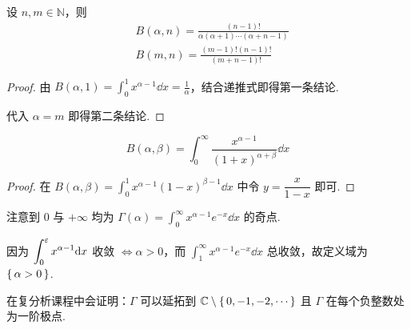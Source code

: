 \begin{inference}
    设 $n,m\in\mathbb{N}$，则
$$
\begin{aligned}
    &B(\alpha,n)=\frac{(n-1)!}{\alpha(\alpha+1)\cdots(\alpha+n-1)}\\
    &B(m,n)=\frac{(m-1)!(n-1)!}{(m+n-1)!}
\end{aligned}
$$
\end{inference}
\begin{proof}
    由 $B(\alpha,1)=\displaystyle\int_0^1x^{\alpha-1}\dd x=\frac{1}{\alpha}$，结合递推式即得第一条结论.

    代入 $\alpha=m$ 即得第二条结论.
\end{proof}


\begin{property}
$$
B(\alpha,\beta)=\int_0^\infty\frac{x^{\alpha-1}}{(1+x)^{\alpha+\beta}}\dd x
$$
\end{property}
\begin{proof}
    在 $B(\alpha,\beta)=\displaystyle\int_0^1x^{\alpha-1}(1-x)^{\beta-1}\dd x$ 中令 $y=\dfrac{x}{1-x}$ 即可.
\end{proof}



注意到 $0$ 与 $+\infty$ 均为 $\Gamma(\alpha)=\displaystyle\int_0^\infty x^{\alpha-1}e^{-x}\dd x$ 的奇点.

因为 $\displaystyle\int_0^\varepsilon x^{\alpha-1}\mathrm{d} x$ 收敛 $\iff\alpha>0$，而 $\displaystyle\int_1^\infty x^{\alpha-1}e^{-x}\dd x$ 总收敛，故定义域为 $\set{\alpha>0}$.

\begin{hint}
    在复分析课程中会证明：$\Gamma$ 可以延拓到 $\mathbb{C}\setminus\set{0,-1,-2,\cdots}$ 且 $\Gamma$ 在每个负整数处为一阶极点.
\end{hint}


